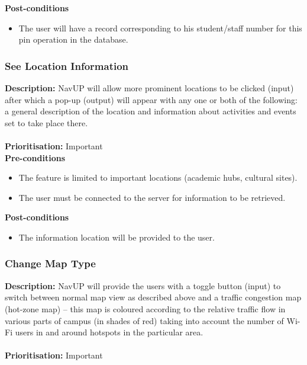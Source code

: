 \documentclass[runningheads,a4paper]{article}
\begin{document}
\textbf{Post-conditions}
\begin{itemize}
  	\item The user will have a record corresponding to his student/staff number for this pin operation in the database.
\end{itemize}

\subsubsection{See Location Information}

\textbf{Description:}  NavUP will allow more prominent locations to be clicked (input) after which a pop-up (output) will appear with any one or both of the following: a general description of the location and information about activities and events set to take place there.\\\\
\noindent
\textbf{Prioritisation:} Important\\
  
  
\textbf{Pre-conditions}
\begin{itemize}
 	\item The feature is limited to important locations (academic hubs, cultural sites).
	\item The user must be connected to the server for information to be retrieved.
\end{itemize}
  
\textbf{Post-conditions}
\begin{itemize}
  	\item The information location will be provided to the user.
\end{itemize}

\subsubsection{Change Map Type}

\textbf{Description:}  NavUP will provide the users with a toggle button (input) to switch between normal map view as described above and a traffic congestion map (hot-zone map) – this map is coloured according to the relative traffic flow in various parts of campus (in shades of red) taking into account the number of Wi-Fi users in and around hotspots in the particular area.\\\\
\noindent
\textbf{Prioritisation:} Important\\
  
\end{document}
